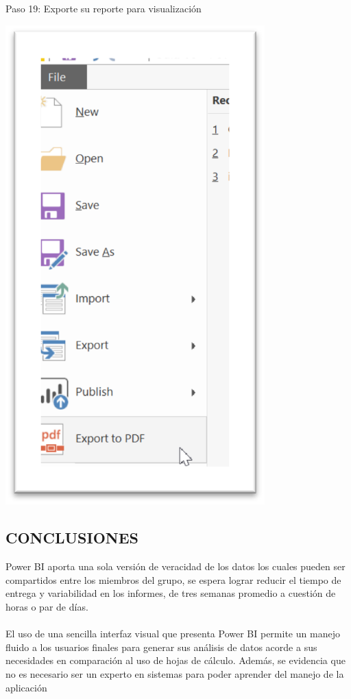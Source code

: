 \documentclass[12pt,letterpaper]{article}
\begin{document}
Paso 19: Exporte su reporte para visualización
\begin{center}
    \includegraphics[width=10cm]{img/23.png}  
\end{center}
\subsection*{CONCLUSIONES}
Power BI aporta una sola versión de veracidad de los datos los cuales pueden ser compartidos entre los miembros del grupo, se espera lograr reducir el tiempo de entrega y variabilidad en los informes, de tres semanas promedio a cuestión de horas o par de días. \\\\
El uso de una sencilla interfaz visual que presenta Power BI permite un manejo fluido a los usuarios finales para generar sus análisis de datos acorde a sus necesidades en comparación al uso de hojas de cálculo. Además, se evidencia que no es necesario ser un experto en sistemas para poder aprender del manejo de la aplicación
\end{document}
